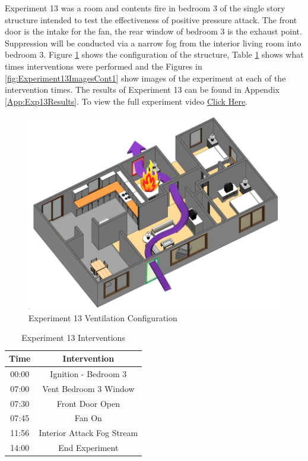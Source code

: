 \documentclass{article}
\begin{document}
Experiment 13 was a room and contents fire in bedroom 3 of the single story structure intended to test the effectiveness of positive pressure attack. The front door is the intake for the fan, the rear window of bedroom 3 is the exhaust point. Suppression will be conducted via a narrow fog from the interior living room into bedroom 3. Figure \ref{fig:Exp13VentConfig} shows the configuration of the structure, Table \ref{Table:Exp13Interventions} shows what times interventions were performed and the Figures in \ref{fig:Experiment13ImagesCont1} show images of the experiment at each of the intervention times. The results of Experiment 13 can be found in Appendix \ref{App:Exp13Results}. To view the full experiment video \href{https://youtu.be/bMQUpJWIFus}{Click Here}.

\begin{figure}[H]
	\centering
	\includegraphics[width=5in]{0_Images/FireExperiments/Single_Story/Experiment_13.jpg}
	\caption{Experiment 13 Ventilation Configuration}
	\label{fig:Exp13VentConfig}
\end{figure}

\begin{table}[H]
	\centering
	\caption{Experiment 13 Interventions}
	\begin{tabular}{|c|c|} 
		\hline
		Time & Intervention \\ \hline \hline
		00:00 & Ignition - Bedroom 3\\ \hline
		07:00 & Vent Bedroom 3 Window \\ \hline
		07:30 & Front Door Open \\ \hline
		07:45 & Fan On \\ \hline
		11:56 & Interior Attack Fog Stream \\ \hline
		14:00 & End Experiment \\ \hline
	\end{tabular}
	\label{Table:Exp13Interventions}
\end{table}
\end{document}
